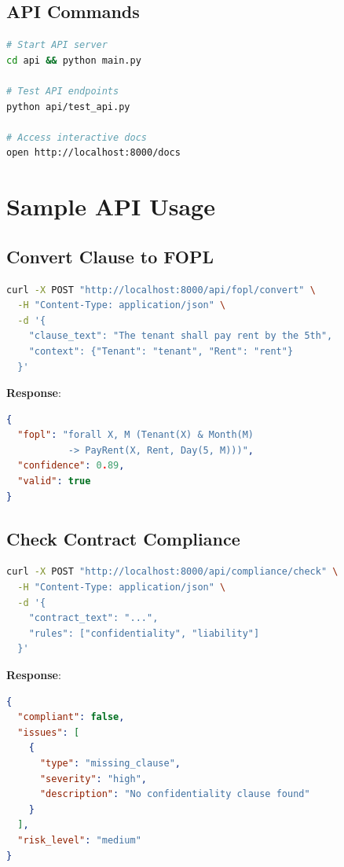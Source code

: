 \documentclass[12pt,a4paper]{article}
\begin{document}
\subsection{API Commands}

\begin{lstlisting}[language=bash]
# Start API server
cd api && python main.py

# Test API endpoints
python api/test_api.py

# Access interactive docs
open http://localhost:8000/docs
\end{lstlisting}

\section{Sample API Usage}

\subsection{Convert Clause to FOPL}

\begin{lstlisting}[language=bash]
curl -X POST "http://localhost:8000/api/fopl/convert" \
  -H "Content-Type: application/json" \
  -d '{
    "clause_text": "The tenant shall pay rent by the 5th",
    "context": {"Tenant": "tenant", "Rent": "rent"}
  }'
\end{lstlisting}

\textbf{Response}:
\begin{lstlisting}[language=json]
{
  "fopl": "forall X, M (Tenant(X) & Month(M) 
           -> PayRent(X, Rent, Day(5, M)))",
  "confidence": 0.89,
  "valid": true
}
\end{lstlisting}

\subsection{Check Contract Compliance}

\begin{lstlisting}[language=bash]
curl -X POST "http://localhost:8000/api/compliance/check" \
  -H "Content-Type: application/json" \
  -d '{
    "contract_text": "...",
    "rules": ["confidentiality", "liability"]
  }'
\end{lstlisting}

\textbf{Response}:
\begin{lstlisting}[language=json]
{
  "compliant": false,
  "issues": [
    {
      "type": "missing_clause",
      "severity": "high",
      "description": "No confidentiality clause found"
    }
  ],
  "risk_level": "medium"
}
\end{lstlisting}
\end{document}
